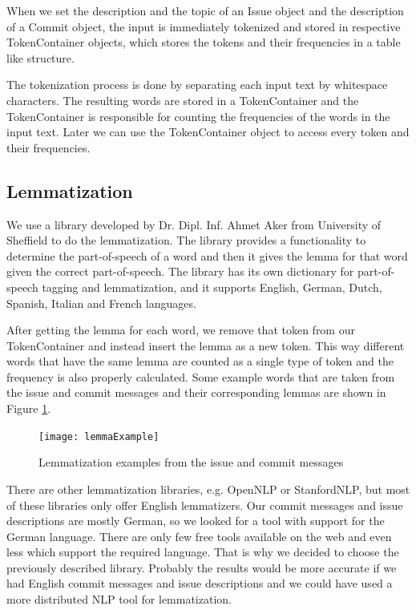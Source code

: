 When we set the description and the topic of an Issue object and the description of a Commit object, the input is immediately tokenized and stored in respective TokenContainer objects, which stores the tokens and their frequencies in a table like structure.

The tokenization process is done by separating each input text by whitespace characters.
The resulting words are stored in a TokenContainer and the TokenContainer is responsible for counting the frequencies of the words in the input text.
Later we can use the TokenContainer object to access every token and their frequencies.


\subsection{Lemmatization}

We use a library developed by Dr. Dipl. Inf. Ahmet Aker from University of Sheffield to do the lemmatization.
The library provides a functionality to determine the part-of-speech of a word and then it gives the lemma for that word given the correct part-of-speech.
The library has its own dictionary for part-of-speech tagging and lemmatization, and it supports English, German, Dutch, Spanish, Italian and French languages.

After getting the lemma for each word, we remove that token from our TokenContainer and instead insert the lemma as a new token.
This way different words that have the same lemma are counted as a single type of token and the frequency is also properly calculated. Some example words that are taken from the issue and commit messages and their corresponding lemmas are shown in Figure \ref{fig:lemma}.

\begin{figure}
\centering
\texttt{[image: lemmaExample]}
\caption{Lemmatization examples from the issue and commit messages}
\label{fig:lemma}
\end{figure}

There are other lemmatization libraries, e.g. OpenNLP or StanfordNLP, but most of these libraries only offer English lemmatizers.
Our commit messages and issue descriptions are mostly German, so we looked for a tool with support for the German language.
There are only few free tools available on the web and even less which support the required language.
That is why we decided to choose the previously described library.
Probably the results would be more accurate if we had English commit messages and issue descriptions and we could have used a more distributed NLP tool for lemmatization.

